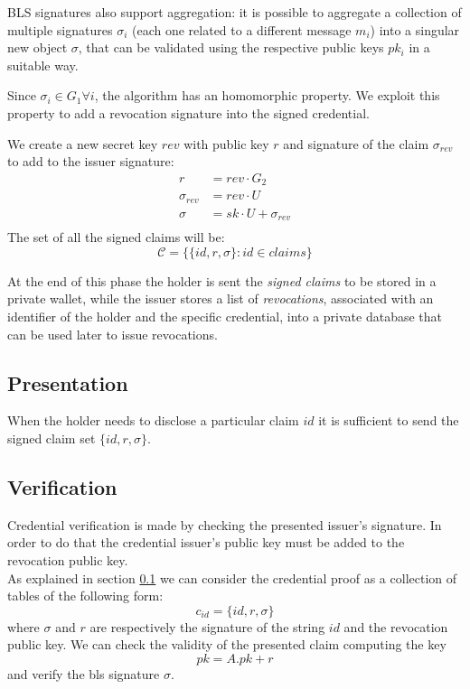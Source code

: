 BLS signatures also support aggregation: it is possible to aggregate a collection of multiple signatures $\sigma_i$ (each one related to a different message $m_i$) into a singular new object $\sigma$, that can be validated using the respective public keys $pk_i$ in a suitable way.

Since $\sigma_i\in G_1 \forall i$, the algorithm has an homomorphic property. We exploit this property to add a revocation signature into the signed credential.

We create a new secret key $rev$ with public key $r$ and signature of the claim $\sigma_{rev}$ to add to the issuer signature:
\begin{equation*}\label{rev_agg}
    \begin{split}
        r &= rev \cdot G_2 \\
        \sigma_{rev} &= rev \cdot U\\
        \sigma &= sk\cdot U + \sigma_{rev}\\
   \end{split}
\end{equation*}
The set of all the signed claims will be:
\begin{equation*}
   \mathcal{C} = \big\{ \{id, r, \sigma \} : id\in claims  \big\}
\end{equation*}

At the end of this phase the holder is sent the \textit{signed claims}
to be stored in a private wallet, while the issuer stores
a list of \textit{revocations}, associated with an identifier of the holder and the specific credential, into a private database that can be used later to
issue revocations.



\subsection{Presentation} \label{presentation}

When the holder needs to disclose a particular claim $id$ it is sufficient to send the signed claim set $\{id, r, \sigma \}$.

\subsection{Verification}

Credential verification is made by checking the presented issuer's signature. In order to do that the credential issuer's public key must be added to the revocation public key.\\
As explained in section \ref{presentation} we can consider the credential proof as a collection of tables of the following form:
\begin{equation*}
    c_{id} = \{id, r, \sigma \}
\end{equation*}
where $\sigma$ and $r$ are respectively the signature of the string $id$ and the revocation public key.
We can check the validity of the presented claim computing the key
\begin{equation*}
    pk = A.pk + r
\end{equation*}
and verify the bls signature $\sigma$.

